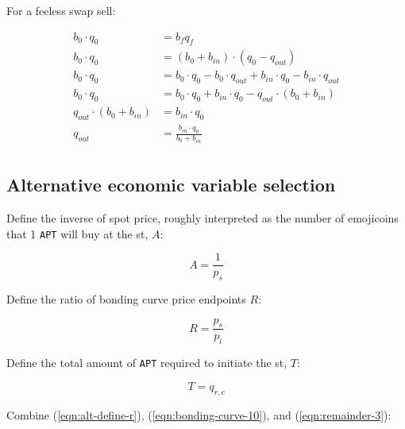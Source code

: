 \documentclass[table, twocolumn]{article}
\begin{document}
For a feeless swap sell:

\begin{align}
  b_0 \cdot q_0               & = b_f q_f \nonumber                               \\
  b_0 \cdot q_0               & = (b_0 + b_{in}) \cdot (q_0 - q_{out}) \nonumber  \\
  b_0 \cdot q_0               & = b_0 \cdot q_0 - b_0 \cdot q_{out} +
  b_{in} \cdot q_0 - b_{in} \cdot q_{out} \nonumber                               \\
  b_0 \cdot q_0               & = b_0 \cdot q_0 + b_{in} \cdot q_0 -
  q_{out} \cdot(b_0 + b_{in}) \nonumber                                           \\
  q_{out} \cdot(b_0 + b_{in}) & = b_{in} \cdot q_0 \nonumber                      \\
  q_{out}                     & = \frac{b_{in} \cdot q_0}{b_0 + b_{in}} \nonumber \\
\end{align}

\subsection{Alternative economic variable selection} \label{sec:alt-vars}

Define the inverse of spot price, roughly interpreted as the number of emojicoins that 1
\texttt{APT} will buy at the \gls*{st}, $A$:

\begin{equation} \label{eqn:alt-define-a}
  A = \frac{1}{p_s}
\end{equation}

Define the ratio of bonding curve price endpoints $R$:

\begin{equation} \label{eqn:alt-define-r}
  R = \frac{p_s}{p_l}
\end{equation}

Define the total amount of \texttt{APT} required to initiate the \gls*{st}, $T$:

\begin{equation} \label{eqn:alt-define-t}
  T = q_{r, c}
\end{equation}

Combine (\ref{eqn:alt-define-r}), (\ref{eqn:bonding-curve-10}), and
(\ref{eqn:remainder-3}):
\end{document}
